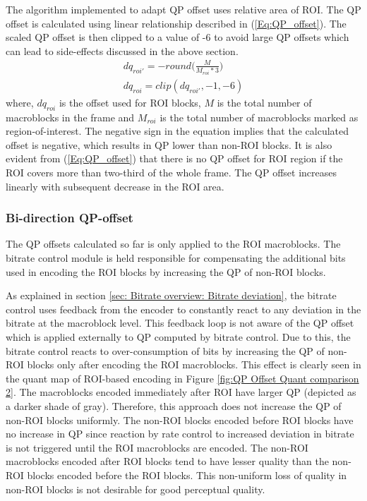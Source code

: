 \documentclass[11pt]{article} %
\begin{document}
The algorithm implemented to adapt QP offset uses relative area of ROI. The QP offset is calculated using linear relationship described in (\ref{Eq:QP_offset}). The scaled QP offset is then clipped to a value of -6 to avoid large QP offsets which can lead to side-effects discussed in the above section.
\begin{equation}
	\label{Eq:QP_offset}
	\begin{aligned}
	dq_{roi'} = -round\Big(\frac{M}{M_{roi} * 3}\Big) \\
	dq_{roi} = clip(dq_{roi'}, -1 , -6)
	\end{aligned}	
\end{equation}
where, $dq_{roi}$ is the offset used for ROI blocks, $M$ is the total number of macroblocks in the frame and $M_{roi}$ is the total number of macroblocks marked as region-of-interest. The negative sign in the equation implies that the calculated offset is negative, which results in QP lower than non-ROI blocks. It is also evident from (\ref{Eq:QP_offset}) that there is no QP offset for ROI region if the ROI covers more than two-third of the whole frame. The QP offset increases linearly with subsequent decrease in the ROI area.

\subsubsection{Bi-direction QP-offset}
The QP offsets calculated so far is only applied to the ROI macroblocks. The bitrate control module is held responsible for compensating the additional bits used in encoding the ROI blocks by increasing the QP of non-ROI blocks. 

As explained in section \ref{sec: Bitrate overview: Bitrate deviation}, the bitrate control uses feedback from the encoder to constantly react to any deviation in the bitrate at the macroblock level. This feedback loop is not aware of the QP offset which is applied externally to QP computed by bitrate control. Due to this, the bitrate control reacts to over-consumption of bits by increasing the QP of non-ROI blocks only after encoding the ROI macroblocks. This effect is clearly seen in the quant map of ROI-based encoding in Figure \ref{fig:QP Offset Quant comparison 2}. The macroblocks encoded immediately after ROI have larger QP (depicted as a darker shade of gray). Therefore, this approach does not increase the QP of non-ROI blocks uniformly. The non-ROI blocks encoded before ROI blocks have no increase in QP since reaction by rate control to increased deviation in bitrate is not triggered until the ROI macroblocks are encoded. The non-ROI macroblocks encoded after ROI blocks tend to have lesser quality than the non-ROI blocks encoded before the ROI blocks. This non-uniform loss of quality in non-ROI blocks is not desirable for good perceptual quality.
\end{document}
